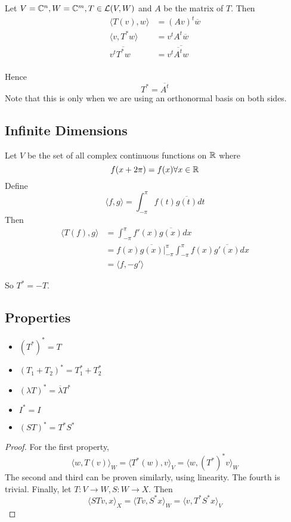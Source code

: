 \documentclass[12pt]{article}
\begin{document}
Let $V = \mathbb{C}^n, W = \mathbb{C}^m, T \in \mathcal L(V,W)$ and $A$ be the matrix of $T$. Then
\begin{align*}
	\langle T(v),w \rangle &= (Av)^t\overline{w} \\
	\langle v,T^*w \rangle &= v^tA^t\overline{w} \\
	v^t\overline{T^*w} &= v^t\overline{\overline{A^t}w} \\
\end{align*}

Hence
$$T^* = \overline{A^t}$$
Note that this is only when we are using an orthonormal basis on both sides.

\subsection{Infinite Dimensions}

Let $V$ be the set of all complex continuous functions on $\mathbb{R}$ where
$$f(x+2\pi) = f(x) \forall x \in \mathbb{R}$$
Define
$$\langle f,g \rangle = \int_{-\pi}^\pi f(t)\overline{g(t)} dt$$
Then
\begin{align*}
	\langle T(f),g \rangle &= \int_{-\pi}^\pi f'(x)\overline{g(x)}dx \\
			       &= f(x)\overline{g(x)} |_{-\pi}^\pi \int_{-\pi}^\pi f(x)\overline{g'(x)}dx \\
			       &= \langle f,-g' \rangle
\end{align*}

So $T^* = -T$.

\subsection{Properties}

\begin{itemize}
	\item $(T^*)^* = T$
	\item $(T_1+T_2)^* = T_1^* + T_2^*$
	\item $(\lambda T)^* = \overline{\lambda}T^*$
	\item $I^* = I$
	\item $(ST)^* = T^*S^*$
\end{itemize}

\begin{proof}
	For the first property,
	$$\langle w,T(v) \rangle_W = \langle T^*(w),v \rangle_V = \langle w,(T^*)^*v \rangle_W$$
	The second and third can be proven similarly, using linearity. The fourth is trivial. Finally, let $T:V\rightarrow W,S:W\rightarrow X$. Then
	$$\langle STv,x \rangle_X = \langle Tv,S^*x \rangle_W = \langle v,T^*S^*x \rangle_V$$
\end{proof}
			       
\end{document}
